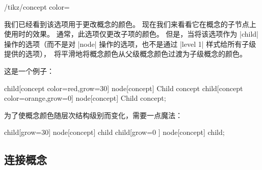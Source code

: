 \begin{key}{/tikz/concept color=}

    我们已经看到该选项用于更改概念的颜色。 现在我们来看看它在概念的子节点上使用时的效果。 通常，此选项仅更改子项的颜色。 但是，当将该选项作为 |child| 操作的选项（而不是对 |node| 操作的选项，也不是通过 |level 1| 样式给所有子级提供的选项），\tikzname\ 将平滑地将概念颜色从父级概念颜色过渡为子级概念的颜色。


    这是一个例子：
\begin{codeexample}[preamble={\usetikzlibrary{mindmap}}]
\tikz[mindmap,concept color=blue!80]
    child[concept color=red,grow=30] {node[concept] {Child concept}}
    child[concept color=orange,grow=0]  {node[concept] {Child concept}};
\end{codeexample}


    为了使概念颜色随层次结构级别而变化，需要一点魔法：

\begin{codeexample}[preamble={\usetikzlibrary{mindmap}}]
\tikz[mindmap,text=white,
      root concept/.style={concept color=blue},
      level 1 concept/.append style=
        {every child/.style={concept color=blue!50}}]
    child[grow=30] {node[concept] {child}}
    child[grow=0 ] {node[concept] {child}};
\end{codeexample}
\end{key}


\subsection{连接概念}

